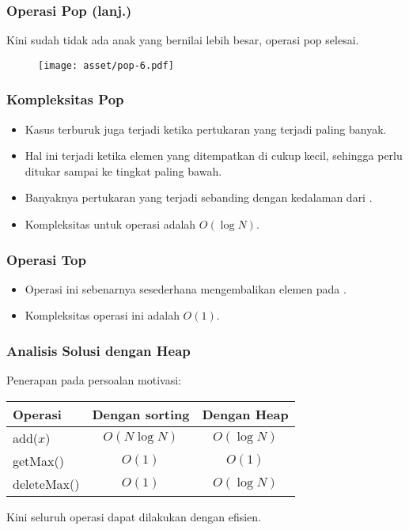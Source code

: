 \begin{frame}
\frametitle{Operasi Pop (lanj.)}
Kini sudah tidak ada anak yang bernilai lebih besar, operasi pop selesai.
\begin{figure}
  \texttt{[image: asset/pop-6.pdf]}
\end{figure}
\end{frame}

\begin{frame}
\frametitle{Kompleksitas Pop}
\begin{itemize}
  \item Kasus terburuk juga terjadi ketika pertukaran yang terjadi paling banyak.
  \item Hal ini terjadi ketika elemen yang ditempatkan di  cukup kecil, sehingga perlu ditukar sampai ke tingkat paling bawah.
  \item Banyaknya pertukaran yang terjadi sebanding dengan kedalaman dari .
  \item Kompleksitas untuk operasi  adalah $O(\log{N})$.
\end{itemize}
\end{frame}

\begin{frame}
\frametitle{Operasi Top}
\begin{itemize}
  \item Operasi ini sebenarnya sesederhana mengembalikan elemen pada  \pbinaryHeap.
  \item Kompleksitas operasi ini adalah $O(1)$.
\end{itemize}
\end{frame}

\begin{frame}
\frametitle{Analisis Solusi dengan Heap}
Penerapan \pheap pada persoalan motivasi:
\begin{table}[ht]
  \begin{tabular}{|l|c|c|}
    \hline Operasi  & Dengan sorting & Dengan Heap \\
    \hline  add($x$) & $O(N \log{N})$ & $O(\log{N})$\\
    \hline  getMax() & $O(1)$ & $O(1)$\\
    \hline  deleteMax() & $O(1)$ & $O(\log{N})$\\
    \hline
  \end{tabular}
\end{table}  

Kini seluruh operasi dapat dilakukan dengan efisien.
\end{frame}

